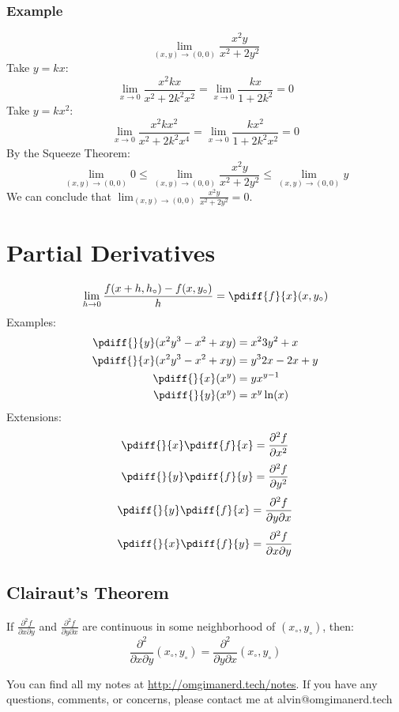 \documentclass[letterpaper, 12pt]{math}
\begin{document}
\subsubsection*{Example}
\[ \lim_{(x,y)\to(0,0)}\frac{x^2y}{x^2+2y^2} \]
Take \( y = kx \):
\[ \lim_{x\to0}\frac{x^2kx}{x^2+2k^2x^2} = \lim_{x\to0}\frac{kx}{1+2k^2} = 0 \]
Take \( y = kx^2 \):
\[ \lim_{x\to0}\frac{x^2kx^2}{x^2+2k^2x^4} = \lim_{x\to0}\frac{kx^2}{1+2k^2x^2}
  = 0 \]
By the Squeeze Theorem:
\[ \lim_{(x,y)\to(0,0)}0 \le \lim_{(x,y)\to(0,0)}\frac{x^2y}{x^2+2y^2} \le
  \lim_{(x,y)\to(0,0)}y \]
We can conclude that \( \lim_{(x,y)\to(0,0)}\frac{x^2y}{x^2+2y^2} = 0 \).

\section*{Partial Derivatives}
\[ \lim_{h\to0}\frac{f(x+h,h_{\circ})-f(x,y_{\circ})}{h} =
  \pdiff{f}{x}(x,y_{\circ}) \]
Examples:
\begin{align*}
  \pdiff{}{y}(x^2y^3-x^2+xy) &= x^23y^2+x \\
  \pdiff{}{x}(x^2y^3-x^2+xy) &= y^32x-2x+y \\
  \pdiff{}{x}(x^y) &= yx^{y-1} \\
  \pdiff{}{y}(x^y) &= x^y\ln(x)
\end{align*}
Extensions:
\[ \pdiff{}{x}\pdiff{f}{x} = \frac{\partial^2{f}}{\partial{x^2}} \]
\[ \pdiff{}{y}\pdiff{f}{y} = \frac{\partial^2{f}}{\partial{y^2}} \]
\[ \pdiff{}{y}\pdiff{f}{x} = \frac{\partial^2{f}}{\partial{y}\partial{x}} \]
\[ \pdiff{}{x}\pdiff{f}{y} = \frac{\partial^2{f}}{\partial{x}\partial{y}} \]

\subsection*{Clairaut's Theorem}
If \( \frac{\partial^2{f}}{\partial{x}\partial{y}} \) and \(
\frac{\partial^2{f}}{\partial{y}\partial{x}} \) are continuous in some
neighborhood of \( (x_{\circ},y_{\circ}) \), then:
\[ \frac{\partial^2}{\partial{x}\partial{y}}(x_{\circ},y_{\circ}) =
  \frac{\partial^2}{\partial{y}\partial{x}}(x_{\circ},y_{\circ}) \]

\begin{center}
  You can find all my notes at \url{http://omgimanerd.tech/notes}. If you have
  any questions, comments, or concerns, please contact me at
  alvin@omgimanerd.tech
\end{center}
\end{document}
